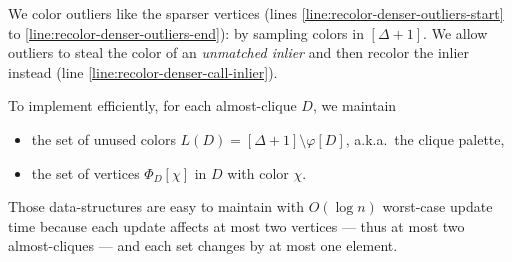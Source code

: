 \documentclass[a4paper,english,11pt]{amsart}
\theoremstyle{definition}
\DeclarePairedDelimiter{\set}{\{}{\}}
\newcommand{\col}{\varphi}
\begin{document}
We color outliers like the sparser vertices (lines \ref{line:recolor-denser-outliers-start} to \ref{line:recolor-denser-outliers-end}): by sampling colors in $[\Delta+1]$. We allow outliers to steal the color of an \emph{unmatched inlier} and then recolor the inlier instead (line \ref{line:recolor-denser-call-inlier}).


To implement \RecolorDense efficiently, for each almost-clique $D$, we maintain
\begin{itemize}
\item the set of unused colors $L(D) = [\Delta + 1] \setminus \col[D]$, a.k.a.\ the clique palette,
    \item the set of vertices $\Phi_D[\chi]$ in $D$ with color $\chi$.
\end{itemize}
Those data-structures are easy to maintain with $O(\log n)$ worst-case update time because each update affects at most two vertices --- thus at most two almost-cliques --- and each set changes by at most one element.
\end{document}
